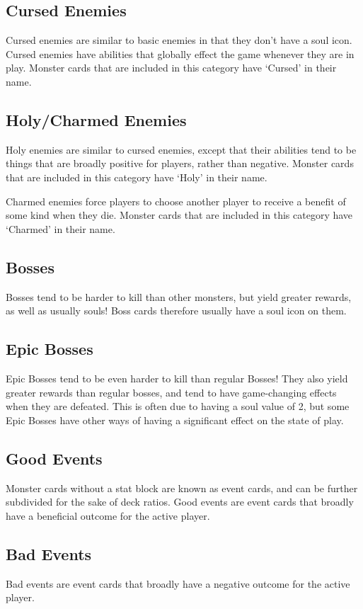 \documentclass[a4paper, twoside]{report} %
\begin{document}
    \subsection*{Cursed Enemies}
    Cursed enemies are similar to basic enemies in that they don’t have a soul icon. Cursed enemies have abilities that globally effect the game whenever they are in play. Monster cards that are included in this category have ‘Cursed’ in their name.
    \subsection*{Holy/Charmed Enemies}
    Holy enemies are similar to cursed enemies, except that their abilities tend to be things that are broadly positive for players, rather than negative. Monster cards that are included in this category have ‘Holy’ in their name.
    
    Charmed enemies force players to choose another player to receive a benefit of some kind when they die. Monster cards that are included in this category have ‘Charmed’ in their name.
    \subsection*{Bosses}
    Bosses tend to be harder to kill than other monsters, but yield greater rewards, as well as usually souls! Boss cards therefore usually have a soul icon on them.
    \subsection*{Epic Bosses}
    Epic Bosses tend to be even harder to kill than regular Bosses! They also yield greater rewards than regular bosses, and tend to have game-changing effects when they are defeated. This is often due to having a soul value of 2, but some Epic Bosses have other ways of having a significant effect on the state of play.
    \subsection*{Good Events}
    Monster cards without a stat block are known as event cards, and can be further subdivided for the sake of deck ratios. Good events are event cards that broadly have a beneficial outcome for the active player.
    \subsection*{Bad Events}
    Bad events are event cards that broadly have a negative outcome for the active player.
    
\end{document}
